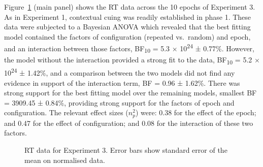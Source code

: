 \documentclass[
  man,
  floatsintext,
  longtable,
  nolmodern,
  notxfonts,
  notimes,
  colorlinks=true,linkcolor=blue,citecolor=blue,urlcolor=blue]{apa7}
\begin{document}
Figure~\ref{fig-RT-exp3} (main panel) shows the RT data across the 10
epochs of Experiment 3. As in Experiment 1, contextual cuing was readily
established in phase 1. These data were subjected to a Bayesian ANOVA
which revealed that the best fitting model contained the factors of
configuration (repeated vs.~random) and epoch, and an interaction
between those factors, BF\textsubscript{10} = 5.3 ×
10\textsuperscript{24} ± 0.77\%. However, the model without the
interaction provided a strong fit to the data, BF\textsubscript{10} =
5.2 × 10\textsuperscript{24} ± 1.42\%, and a comparison between the two
models did not find any evidence in support of the interaction term, BF
= 0.96 ± 1.62\%. There was strong support for the best fitting model
over the remaining models, smallest BF = 3909.45 ± 0.84\%, providing
strong support for the factors of epoch and configuration. The relevant
effect sizes (\(n^2_p\)) were: 0.38 for the effect of the epoch; and
0.47 for the effect of configuration; and 0.08 for the interaction of
these two factors.

\begin{figure}[H]


\caption{\label{fig-RT-exp3}RT data for Experiment 3. Error bars show
standard error of the mean on normalised data.}

\end{figure}%
\end{document}
